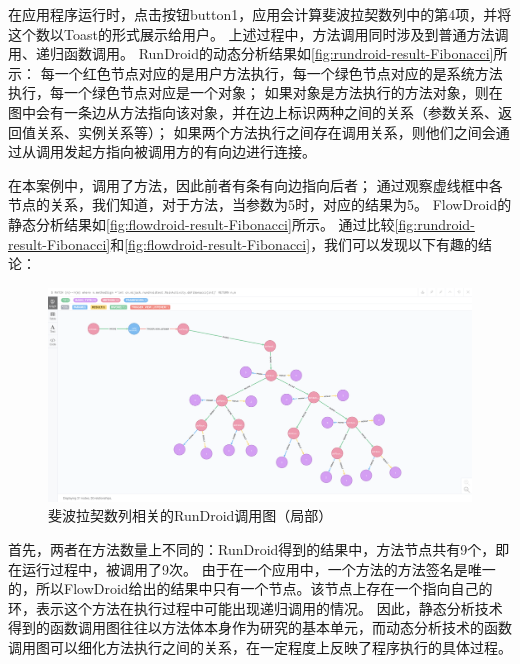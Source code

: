 在应用程序运行时，点击按钮button1，应用会计算斐波拉契数列中的第4项，并将这个数以Toast的形式展示给用户。
上述过程中，方法调用同时涉及到普通方法调用、递归函数调用。
RunDroid的动态分析结果如\autoref{fig:rundroid-result-Fibonacci}所示：
每一个红色节点对应的是用户方法执行，每一个绿色节点对应的是系统方法执行，每一个绿色节点对应是一个对象；
如果对象是方法执行的方法对象，则在图中会有一条边从方法指向该对象，并在边上标识两种之间的关系（参数关系、返回值关系、实例关系等）；
如果两个方法执行之间存在调用关系，则他们之间会通过从调用发起方指向被调用方的有向边进行连接。

在本案例中，调用了方法，因此前者有条有向边指向后者；
通过观察虚线框中各节点的关系，我们知道，对于方法，当参数为5时，对应的结果为5。
FlowDroid的静态分析结果如\autoref{fig:flowdroid-result-Fibonacci}所示。
通过比较\autoref{fig:rundroid-result-Fibonacci}和\autoref{fig:flowdroid-result-Fibonacci}，我们可以发现以下有趣的结论：


\begin{figure}[!ht]
	\centering
	\includegraphics[width=\textwidth]{./Figures/doFibonacci-rundroid.png}
	\caption{斐波拉契数列相关的RunDroid调用图（局部）}
	\label{fig:rundroid-result-Fibonacci}
\end{figure}

首先，两者在方法数量上不同的：RunDroid得到的结果中，方法节点共有9个，即在运行过程中，被调用了9次。
由于在一个应用中，一个方法的方法签名是唯一的，所以FlowDroid给出的结果中只有一个节点。该节点上存在一个指向自己的环，表示这个方法在执行过程中可能出现递归调用的情况。
因此，静态分析技术得到的函数调用图往往以方法体本身作为研究的基本单元，而动态分析技术的函数调用图可以细化方法执行之间的关系，在一定程度上反映了程序执行的具体过程。



